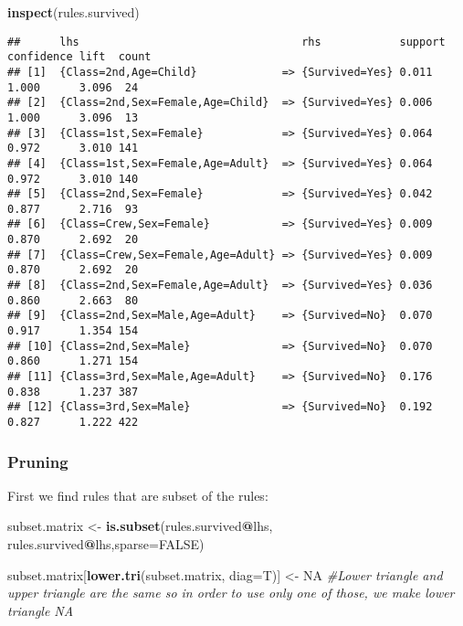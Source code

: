 \documentclass[]{article}
\newenvironment{Shaded}{\begin{snugshade}}{\end{snugshade}}
\newcommand{\CommentTok}[1]{\textcolor[rgb]{0.56,0.35,0.01}{\textit{#1}}}
\newcommand{\DataTypeTok}[1]{\textcolor[rgb]{0.13,0.29,0.53}{#1}}
\newcommand{\KeywordTok}[1]{\textcolor[rgb]{0.13,0.29,0.53}{\textbf{#1}}}
\newcommand{\NormalTok}[1]{#1}
\newcommand{\OperatorTok}[1]{\textcolor[rgb]{0.81,0.36,0.00}{\textbf{#1}}}
\newcommand{\OtherTok}[1]{\textcolor[rgb]{0.56,0.35,0.01}{#1}}
\newcommand{\StringTok}[1]{\textcolor[rgb]{0.31,0.60,0.02}{#1}}
\begin{document}
\begin{Shaded}
\begin{Highlighting}[]
\KeywordTok{inspect}\NormalTok{(rules.survived)}
\end{Highlighting}
\end{Shaded}

\begin{verbatim}
##      lhs                                  rhs            support confidence lift  count
## [1]  {Class=2nd,Age=Child}             => {Survived=Yes} 0.011   1.000      3.096  24  
## [2]  {Class=2nd,Sex=Female,Age=Child}  => {Survived=Yes} 0.006   1.000      3.096  13  
## [3]  {Class=1st,Sex=Female}            => {Survived=Yes} 0.064   0.972      3.010 141  
## [4]  {Class=1st,Sex=Female,Age=Adult}  => {Survived=Yes} 0.064   0.972      3.010 140  
## [5]  {Class=2nd,Sex=Female}            => {Survived=Yes} 0.042   0.877      2.716  93  
## [6]  {Class=Crew,Sex=Female}           => {Survived=Yes} 0.009   0.870      2.692  20  
## [7]  {Class=Crew,Sex=Female,Age=Adult} => {Survived=Yes} 0.009   0.870      2.692  20  
## [8]  {Class=2nd,Sex=Female,Age=Adult}  => {Survived=Yes} 0.036   0.860      2.663  80  
## [9]  {Class=2nd,Sex=Male,Age=Adult}    => {Survived=No}  0.070   0.917      1.354 154  
## [10] {Class=2nd,Sex=Male}              => {Survived=No}  0.070   0.860      1.271 154  
## [11] {Class=3rd,Sex=Male,Age=Adult}    => {Survived=No}  0.176   0.838      1.237 387  
## [12] {Class=3rd,Sex=Male}              => {Survived=No}  0.192   0.827      1.222 422
\end{verbatim}

\hypertarget{pruning}{%
\subsubsection{Pruning}\label{pruning}}

First we find rules that are subset of the rules:

\begin{Shaded}
\begin{Highlighting}[]
\NormalTok{subset.matrix <-}\StringTok{ }\KeywordTok{is.subset}\NormalTok{(rules.survived}\OperatorTok{@}\NormalTok{lhs, rules.survived}\OperatorTok{@}\NormalTok{lhs,}\DataTypeTok{sparse=}\OtherTok{FALSE}\NormalTok{)}

\NormalTok{subset.matrix[}\KeywordTok{lower.tri}\NormalTok{(subset.matrix, }\DataTypeTok{diag=}\NormalTok{T)] <-}\StringTok{ }\OtherTok{NA} \CommentTok{#Lower triangle and upper triangle are the same so in order to use only one of those, we make lower triangle NA}
\end{Highlighting}
\end{Shaded}
\end{document}
